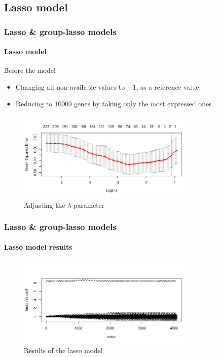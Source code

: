 \documentclass[12pt, english]{beamer}
\begin{document}
\subsection{Lasso model}
\begin{frame}
\frametitle{Lasso \& group-lasso models}
\framesubtitle{Lasso model}
\begin{exampleblock}{Before the model}
    \begin{itemize}
        \item Changing all non-available values to \num{-1}, as a reference value.
        \item Reducing to \num{10000} genes by taking only the most expressed ones.
    \end{itemize}
\end{exampleblock}
\vspace*{-0.5cm}
\begin{figure}
    \centering
    \includegraphics[width=0.8\textwidth]{lasso.png}
    \caption{Adjusting the \(\lambda\) parameter}
\end{figure}
\end{frame}
\begin{frame}
\frametitle{Lasso \& group-lasso models}
\framesubtitle{Lasso model results}
\begin{figure}[H]
    \centering
    \includegraphics[width=0.8\textwidth]{lasso_result.png}
    \caption{Results of the lasso model}
\end{figure}
\end{frame}
\end{document}
